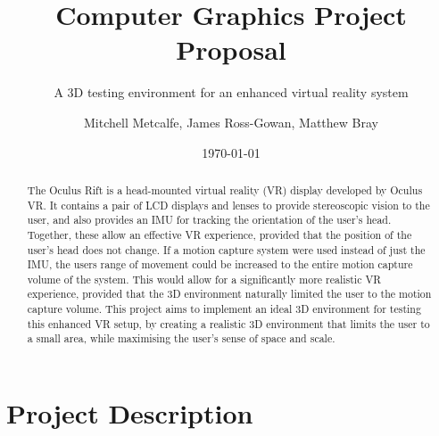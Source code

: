 \documentclass[11pt]{scrartcl} %
\title{Computer Graphics Project Proposal}
\subtitle{A 3D testing environment for an enhanced virtual reality system}
\author{Mitchell Metcalfe, James Ross-Gowan, Matthew Bray }
\date{\today} %
\begin{document}
\maketitle

\begin{abstract}

    The Oculus Rift is a head-mounted virtual reality (VR) display developed by
    Oculus VR. It contains a pair of LCD displays and lenses to provide
    stereoscopic vision to the user, and also provides an IMU for tracking the
    orientation of the user's head. Together, these allow an effective VR
    experience, provided that the position of the user's head does not change.
    If a motion capture system were used instead of just the IMU, the users
    range of movement could be increased to the entire motion capture volume
    of the system. This would allow for a significantly more realistic VR
    experience, provided that the 3D environment naturally limited the user to
    the motion capture volume. This project aims to implement an ideal 3D
    environment for testing this enhanced VR setup, by creating a realistic 3D
    environment that limits the user to a small area, while maximising the
    user's sense of space and scale.

\end{abstract}


    





\section*{Project Description}
\end{document}
